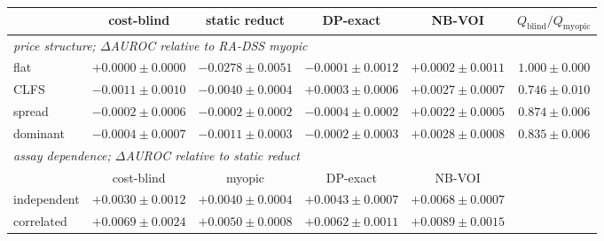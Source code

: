 \begin{tabular}{lccccc}
\toprule
& cost-blind & static reduct & DP-exact & NB-VOI & $Q_{\mathrm{blind}}/Q_{\mathrm{myopic}}$ \\
\midrule
\multicolumn{6}{l}{\emph{price structure; $\Delta$AUROC relative to RA-DSS myopic}}\\
flat & $+0.0000\pm0.0000$ & $-0.0278\pm0.0051$ & $-0.0001\pm0.0012$ & $+0.0002\pm0.0011$ & $1.000\pm0.000$ \\
CLFS & $-0.0011\pm0.0010$ & $-0.0040\pm0.0004$ & $+0.0003\pm0.0006$ & $+0.0027\pm0.0007$ & $0.746\pm0.010$ \\
spread & $-0.0002\pm0.0006$ & $-0.0002\pm0.0002$ & $-0.0004\pm0.0002$ & $+0.0022\pm0.0005$ & $0.874\pm0.006$ \\
dominant & $-0.0004\pm0.0007$ & $-0.0011\pm0.0003$ & $-0.0002\pm0.0003$ & $+0.0028\pm0.0008$ & $0.835\pm0.006$ \\
\midrule
\multicolumn{6}{l}{\emph{assay dependence; $\Delta$AUROC relative to static reduct}}\\
& cost-blind & myopic & DP-exact & NB-VOI & \\
independent & $+0.0030\pm0.0012$ & $+0.0040\pm0.0004$ & $+0.0043\pm0.0007$ & $+0.0068\pm0.0007$ & \\
correlated & $+0.0069\pm0.0024$ & $+0.0050\pm0.0008$ & $+0.0062\pm0.0011$ & $+0.0089\pm0.0015$ & \\
\bottomrule
\end{tabular}